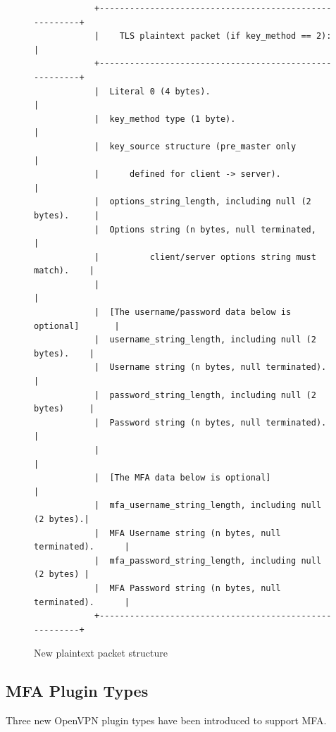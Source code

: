 \documentclass[11pt,oneside]{book}
\begin{document}
\begin{figure}[t]
    \label{MFA:New Packet}
    \centering
    \begin{verbatim}
            +-------------------------------------------------------+
            |    TLS plaintext packet (if key_method == 2):         |
            +-------------------------------------------------------+
            |  Literal 0 (4 bytes).                                 |
            |  key_method type (1 byte).                            |
            |  key_source structure (pre_master only                |
            |      defined for client -> server).                   |
            |  options_string_length, including null (2 bytes).     |
            |  Options string (n bytes, null terminated,            |
            |          client/server options string must match).    |
            |                                                       |
            |  [The username/password data below is optional]       |
            |  username_string_length, including null (2 bytes).    |
            |  Username string (n bytes, null terminated).          |
            |  password_string_length, including null (2 bytes)     |
            |  Password string (n bytes, null terminated).          |
            |                                                       |
            |  [The MFA data below is optional]                     |
            |  mfa_username_string_length, including null (2 bytes).|
            |  MFA Username string (n bytes, null terminated).      |
            |  mfa_password_string_length, including null (2 bytes) |
            |  MFA Password string (n bytes, null terminated).      |
            +-------------------------------------------------------+
    \end{verbatim}
    \vspace{-10mm}
    \caption{New plaintext packet structure}
\end{figure}

\subsection{MFA Plugin Types}
\label{MFA:Types}
Three new OpenVPN plugin types have been introduced to support MFA.
\end{document}
